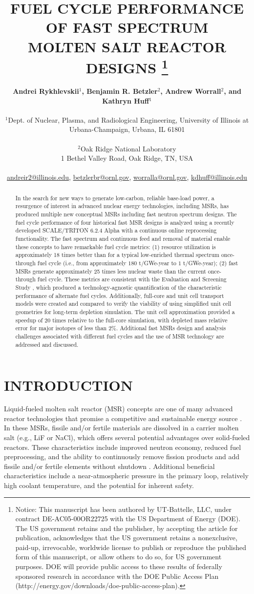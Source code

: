 \documentclass[letterpaper]{mandc2019}
\title{FUEL CYCLE PERFORMANCE OF FAST SPECTRUM \\
  MOLTEN SALT REACTOR DESIGNS
\footnote{Notice:  This manuscript has been authored by UT-Battelle, LLC, under contract DE-AC05-00OR22725 with the US Department of Energy (DOE). The US government retains and the publisher, by accepting the article for publication, acknowledges that the US government retains a nonexclusive, paid-up, irrevocable, worldwide license to publish or reproduce the published form of this manuscript, or allow others to do so, for US government purposes. DOE will provide public access to these results of federally sponsored research in accordance with the DOE Public Access Plan (http://energy.gov/downloads/doe-public-access-plan).}
		}
\author{%
  \textbf{Andrei Rykhlevskii$^1$, Benjamin R. Betzler$^2$, Andrew Worrall$^2$, and Kathryn Huff$^1$} \\
\\
  $^1$Dept. of Nuclear, Plasma, and Radiological Engineering, University of Illinois at \\
  Urbana-Champaign, Urbana, IL 61801 \\
\\
  $^2$Oak Ridge National Laboratory \\
1 Bethel Valley Road, Oak Ridge, TN, USA  \\
\\
  \url{andreir2@illinois.edu}, \url{betzlerbr@ornl.gov}, \url{worralla@ornl.gov}, \url{kdhuff@illinois.edu}
}
\begin{document}
\maketitle
\justify

\begin{abstract}
In the search for new ways to generate low-carbon, reliable base-load power, a resurgence of interest in advanced nuclear energy technologies, including \glspl{MSR}, has produced multiple new conceptual \glspl{MSR} including fast neutron spectrum designs. 
The fuel cycle performance of four historical fast \gls{MSR} designs is analyzed using a recently developed SCALE/TRITON 6.2.4 Alpha with a continuous online reprocessing functionality.
The fast spectrum and continuous feed and removal of material enable these concepts to have remarkable fuel cycle metrics: (1) resource utilization is approximately 18 times better than for a typical low-enriched thermal spectrum once-through fuel cycle (i.e., from approximately $180$ t/GWe-year to $1$ t/GWe-year); (2) fast \glspl{MSR} generate approximately 25 times less nuclear waste than the current once-through fuel cycle.
These metrics are consistent with the Evaluation and Screening Study \cite{wigeland_nuclear_2014-4}, which produced a technology-agnostic quantification of the characteristic performance of alternate fuel cycles.
Additionally, full-core and unit cell transport models were created and compared to verify the viability of using simplified unit cell geometries for long-term depletion simulation.
The unit cell approximation provided a speedup of 20 times relative to the full-core simulation, with depleted mass relative error for major isotopes of less than 2\%.
Additional fast \glspl{MSR} design and analysis challenges associated with different fuel cycles and the use of \gls{MSR} technology are addressed and discussed.
\end{abstract}

\section{INTRODUCTION}
Liquid-fueled molten salt reactor (\gls{MSR}) concepts are one of many advanced reactor technologies that promise a competitive and sustainable energy source \cite{siemer_why_2015}.
In these \gls{MSR}s, fissile and/or fertile materials are dissolved in a carrier molten salt (e.g., LiF or NaCl), which offers several potential advantages over solid-fueled reactors.
These characteristics include improved neutron economy, reduced fuel preprocessing, and the ability to continuously remove fission products and add fissile and/or fertile elements without shutdown \cite{leblanc_molten_2010}.
Additional beneficial characteristics include a near-atmospheric pressure in the primary loop, relatively high coolant temperature, and the potential for inherent safety. 
\end{document}
